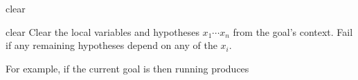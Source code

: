 \begin{tactic}{clear}
  \begin{tsyntax}[empty]{clear}
  Clear the local variables and hypotheses $x_1 \cdots x_n$ from the
  goal's context. Fail if any remaining hypotheses depend on any of the
  $x_i$.

  For example, if the current goal is
   then
  running 
  produces
  \end{tsyntax}
\end{tactic}
